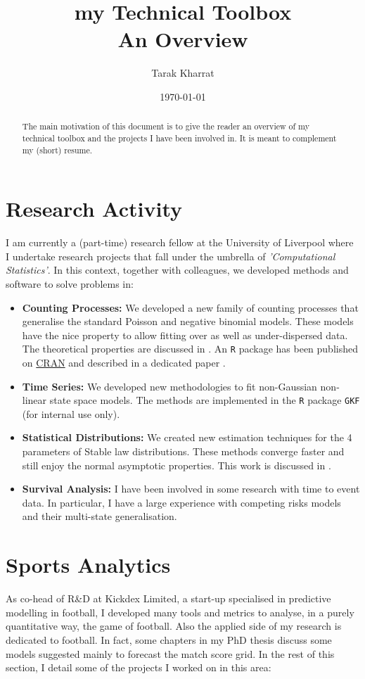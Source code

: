 \documentclass[a4paper,twoside,11pt]{article}
\author[1, 2]{Tarak Kharrat}
\affil[1]{University of Liverpool, London Campus, UK.}
\affil[2]{Kickdex Limited, Lodon, UK.}
\date{\today}
\title{my Technical Toolbox\\\medskip
\large An Overview}
\begin{document}
\maketitle
\begin{abstract}
The main motivation of this document is to give the reader an overview of my
technical toolbox and the projects I have been involved in. It is meant to
complement my (short) resume.
\end{abstract}

\section{Research Activity}
\label{sec:org0d483c0}
I am currently a (part-time) research fellow at the University of Liverpool
where I undertake research projects that fall under the umbrella of
\emph{'Computational Statistics'}. In this context, together with colleagues, we
developed methods and software to solve problems in:
\begin{itemize}
\item \textbf{Counting Processes:} We developed a new family of counting processes that
generalise the standard Poisson and negative binomial models. These models
have the nice property to allow fitting over as well as under-dispersed
data. The theoretical properties are discussed in \citet{baker2017event}. An
\texttt{R} package \citet{Rcore} has been published on \href{https://CRAN.R-project.org/package=Countr}{CRAN} and described in a
dedicated paper \citep{kharrat2018jss}.

\item \textbf{Time Series:} We developed new methodologies to fit non-Gaussian non-linear
state space models. The methods are implemented in the \texttt{R} package \texttt{GKF} (for
internal use only).

\item \textbf{Statistical Distributions:} We created new estimation techniques for the 4
parameters of Stable law distributions. These methods converge faster and
still enjoy the normal asymptotic properties. This work is discussed in
\cite{kharrat2015jss}.
\item \textbf{Survival Analysis:} I have been involved in some research with time to event
data. In particular, I have a large experience with competing risks models and
their multi-state generalisation.
\end{itemize}

\section{Sports Analytics}
\label{sec:orgfb52d45}
As co-head of R\&D at Kickdex Limited, a start-up specialised in predictive
modelling in football, I developed many tools and metrics to analyse, in a
purely quantitative way, the game of football. Also the applied side of my
research is dedicated to football. In fact, some chapters in my PhD thesis 
\citep{TarakPhd} discuss some models suggested mainly to forecast the match
score grid. In the rest of this section, I detail some of the projects I worked
on in this area:
\end{document}
